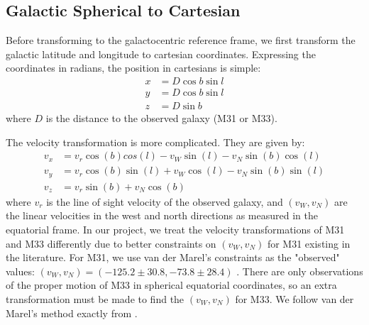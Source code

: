 \documentclass[iop,apj]{emulateapj}
\begin{document}
\subsection{Galactic Spherical to Cartesian}
\label{sec:sphere_to_cart}
Before transforming to the galactocentric reference frame, we first transform the galactic latitude and longitude to cartesian coordinates. Expressing the coordinates in radians, the position in cartesians is simple:
\begin{equation}
\begin{aligned}
x &= D\cos b\sin l \\
y &= D\cos b\sin l \\
z &= D\sin b
\end{aligned}
\end{equation}
where $D$ is the distance to the observed galaxy (M31 or M33). 
\par The velocity transformation is more complicated.  They are given by:
\begin{equation}
\begin{aligned}
v_{x} &= v_{r}\cos(b)cos(l) - v_{W}\sin(l) - v_{N}\sin(b)\cos(l)\\
v_{y} &= v_{r}\cos(b)\sin(l) + v_{W}\cos(l) - v_{N}\sin(b)\sin(l) \\
v_{z} &= v_{r}\sin(b) + v_{N}\cos(b)
\end{aligned}
\end{equation}
where $v_{r}$ is the line of sight velocity of the observed galaxy, and $(v_{W},v_{N})$ are the linear velocities in the west and north directions as measured in the equatorial frame. In our project, we treat the velocity transformations of M31 and M33 differently due to better constraints on $(v_{W},v_{N})$ for M31 existing in the literature. For M31, we use van der Marel's constraints as the "observed" values: $(v_{W},v_{N}) = (-125.2 \pm 30.8, -73.8 \pm 28.4)$ \citep{vdm12m31}. There are only observations of the proper motion of M33 in spherical equatorial coordinates, so an extra transformation must be made to find the $(v_{W},v_{N})$ for M33. We follow van der Marel's method exactly from \cite{VdM08}.
\end{document}
